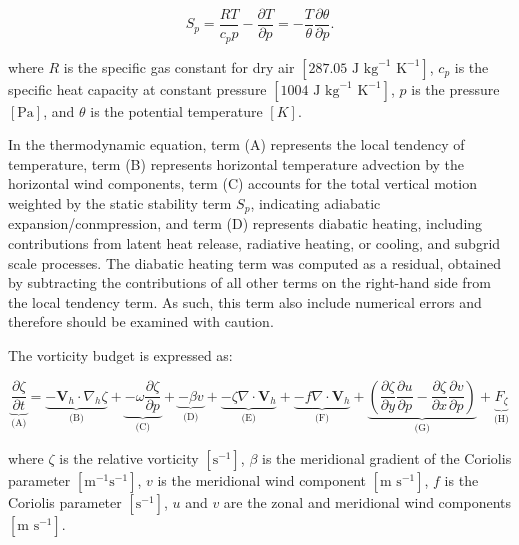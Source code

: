 \documentclass[pdflatex,sn-chicago]{sn-jnl}%
\theoremstyle{plain}
\theoremstyle{definition}
\theoremstyle{remark}
\theoremstyle{definition}
\begin{document}
\begin{equation}
S_p = \frac{R T}{c_p p} - \frac{\partial T}{\partial p} = - \frac{T}{\theta} \frac{\partial \theta}{\partial p}.
\end{equation}

where \(R\) is the specific gas constant for dry air \([287.05 \text{ J kg}^{-1} \text{ K}^{-1}]\), \(c_p\) is the specific heat capacity at constant pressure \([1004 \text{ J kg}^{-1} \text{ K}^{-1}]\), \(p\) is the pressure \([\text{Pa}]\), and \(\theta\) is the potential temperature \([K]\). 

In the thermodynamic equation, term (A) represents the local tendency of temperature, term (B) represents horizontal temperature advection by the horizontal wind components, term (C) accounts for the total vertical motion weighted by the static stability term \(S_p\), indicating adiabatic expansion/conmpression, and term (D) represents diabatic heating, including contributions from latent heat release, radiative heating, or cooling, and subgrid scale processes. The diabatic heating term was computed as a residual, obtained by subtracting the contributions of all other terms on the right-hand side from the local tendency term. As such, this term also include numerical errors and therefore should be examined with caution.

The vorticity budget is expressed as:

\begin{equation}
\underbrace{\frac{\partial \zeta}{\partial t}}_{\text{(A)}} = 
\underbrace{-\mathbf{V}_h \cdot \nabla_h \zeta}_{\text{(B)}} 
+ \underbrace{- \omega \frac{\partial \zeta}{\partial p}}_{\text{(C)}} 
+ \underbrace{- \beta v}_{\text{(D)}} 
+ \underbrace{- \zeta \nabla \cdot \mathbf{V}_h}_{\text{(E)}} 
+ \underbrace{- f \nabla \cdot \mathbf{V}_h}_{\text{(F)}} 
+ \underbrace{\left( \frac{\partial \zeta}{\partial y} \frac{\partial u}{\partial p} - \frac{\partial \zeta}{\partial x} \frac{\partial v}{\partial p} \right)}_{\text{(G)}} 
+ \underbrace{F_\zeta}_{\text{(H)}}
\end{equation}

where \(\zeta\) is the relative vorticity \([\text{s}^{-1}]\), \(\beta\) is the meridional gradient of the Coriolis parameter \([\text{m}^{-1}\text{s}^{-1}]\), \(v\) is the meridional wind component \([\text{m s}^{-1}]\), \(f\) is the Coriolis parameter \([\text{s}^{-1}]\), \(u\) and \(v\) are the zonal and meridional wind components \([\text{m s}^{-1}]\).
\end{document}
